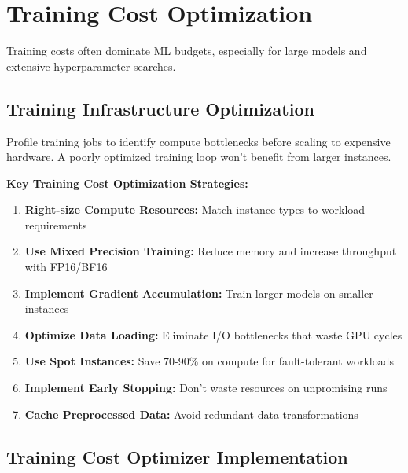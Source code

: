 \section{Training Cost Optimization}

Training costs often dominate ML budgets, especially for large models and extensive hyperparameter searches.

\subsection{Training Infrastructure Optimization}

\begin{bestpractice}
Profile training jobs to identify compute bottlenecks before scaling to expensive hardware. A poorly optimized training loop won't benefit from larger instances.
\end{bestpractice}

\textbf{Key Training Cost Optimization Strategies:}

\begin{enumerate}
    \item \textbf{Right-size Compute Resources:} Match instance types to workload requirements
    \item \textbf{Use Mixed Precision Training:} Reduce memory and increase throughput with FP16/BF16
    \item \textbf{Implement Gradient Accumulation:} Train larger models on smaller instances
    \item \textbf{Optimize Data Loading:} Eliminate I/O bottlenecks that waste GPU cycles
    \item \textbf{Use Spot Instances:} Save 70-90\% on compute for fault-tolerant workloads
    \item \textbf{Implement Early Stopping:} Don't waste resources on unpromising runs
    \item \textbf{Cache Preprocessed Data:} Avoid redundant data transformations
\end{enumerate}

\subsection{Training Cost Optimizer Implementation}

